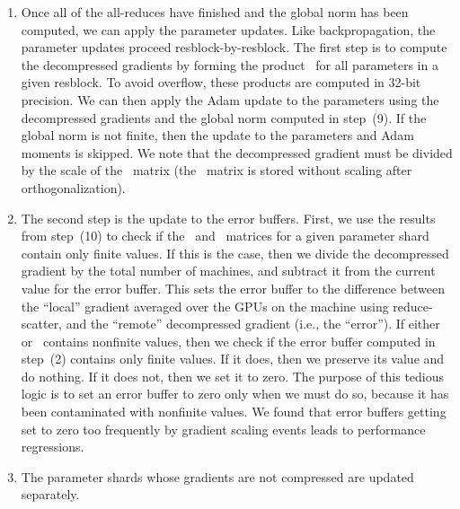\documentclass{article}
\begin{document}
\begin{enumerate}
    \item Once all of the all-reduces have finished and the global norm has been computed, we can apply the parameter updates. Like backpropagation, the parameter updates proceed resblock-by-resblock. The first step is to compute the decompressed gradients by forming the product~ for all parameters in a given resblock. To avoid overflow, these products are computed in 32-bit precision. We can then apply the Adam update to the parameters using the decompressed gradients and the global norm computed in step~(9). If the global norm is not finite, then the update to the parameters and Adam moments is skipped. We note that the decompressed gradient must be divided by the scale of the ~matrix (the ~matrix is stored without scaling after orthogonalization).
    \item The second step is the update to the error buffers. First, we use the results from step~(10) to check if the~ and~ matrices for a given parameter shard contain only finite values. If this is the case, then we divide the decompressed gradient by the total number of machines, and subtract it from the current value for the error buffer. This sets the error buffer to the difference between the ``local'' gradient averaged over the GPUs on the machine using reduce-scatter, and the ``remote'' decompressed gradient (i.e., the ``error''). If either~ or~ contains nonfinite values, then we check if the error buffer computed in step~(2) contains only finite values. If it does, then we preserve its value and do nothing. If it does not, then we set it to zero. The purpose of this tedious logic is to set an error buffer to zero only when we must do so, because it has been contaminated with nonfinite values. We found that error buffers getting set to zero too frequently by gradient scaling events leads to performance regressions.
    \item The parameter shards whose gradients are not compressed are updated separately.
\end{enumerate}
\end{document}
